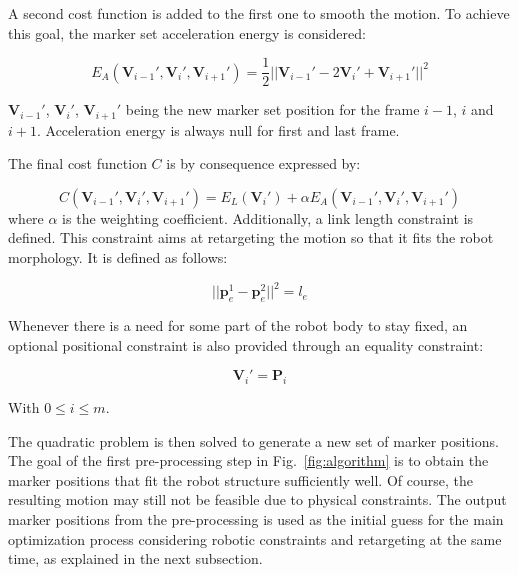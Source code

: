 \documentclass[letterpaper, 10 pt, conference]{ieeeconf}  %
\begin{document}
A second cost function is added to the first one to smooth the
motion. To achieve this goal, the marker set acceleration energy is
considered:

\begin{equation}
  E_A(\mathbf{V}_{i-1}', \mathbf{V}_{i}', \mathbf{V}_{i+1}') =
  \frac{1}{2} || \mathbf{V}_{i-1}' - 2 \mathbf{V}_{i}' +
  \mathbf{V}_{i+1}' ||^2
\label{eq:acc-energy}
\end{equation}

$\mathbf{V}_{i-1}'$, $\mathbf{V}_{i}'$, $\mathbf{V}_{i+1}'$ being the
new marker set position for the frame $i - 1$, $i$ and $i +
1$. Acceleration energy is always null for first and last frame.

The final cost function $C$ is by consequence expressed by:

\begin{equation}
    C(\mathbf{V}_{i-1}', \mathbf{V}_{i}', \mathbf{V}_{i+1}') =
    E_L(\mathbf{V}_{i}') + \alpha E_A(\mathbf{V}_{i-1}',
    \mathbf{V}_{i}', \mathbf{V}_{i+1}') 
\label{eq:cost-function}
\end{equation}
where $\alpha$ is the weighting coefficient.
Additionally, a link length constraint is defined. This constraint
aims at retargeting the motion so that it fits the robot
morphology. It is defined as follows:

\begin{equation}
|| \mathbf{p}^1_e - \mathbf{p}^2_e ||^2 = l_e
\end{equation}


Whenever there is a need for some part of the robot body to stay
fixed, an optional positional constraint is also provided through an
equality constraint:

\begin{equation}
  \mathbf{V}_i' = \mathbf{P}_i
\end{equation}

With $0 \leq i \leq m$.



The quadratic problem is then solved to generate a new set of marker
positions. 
The goal of the first pre-processing step in Fig.~\ref{fig:algorithm}
is to obtain the 
marker positions that fit the robot structure sufficiently well.
Of course, the resulting motion may still not be feasible due to
physical constraints.
The output marker positions from the pre-processing is used as the
initial guess for the main optimization process considering robotic
constraints and retargeting at the same time, as explained in the next
subsection. 
\end{document}
